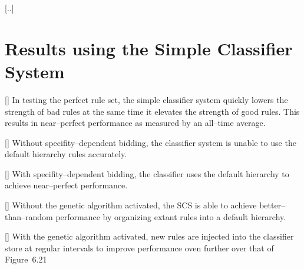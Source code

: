 [..]

\section*{Results using the Simple Classifier System}

\setcounter{figure}{17}
[]{%
In testing the perfect rule set, the simple
classifier system quickly lowers the strength of bad rules at the
same time it elevates the strength of good rules. This results in
near--perfect performance as measured by an all--time average.
}

[]{%
Without specifity--dependent bidding, the classifier system is
unable to use the default hierarchy rules accurately.
}

[]{%
With specifity--dependent bidding, the classifier uses the default
hierarchy to achieve near--perfect performance.
}

[]{%
Without the genetic algorithm activated, the SCS is able to achieve
better--than--random performance by organizing extant rules into a
default hierarchy.
}

[]{%
With the genetic algorithm activated, new rules are injected into
the classifier store at regular intervals to improve performance
oven further over that of Figure~6.21
}

\nocite{Mue87}
\nocite{Hei93b}
\nocite{Gil89}
\nocite{FGMS90}
\nocite{PH90}
\nocite{WK92}
\nocite{WH87}





